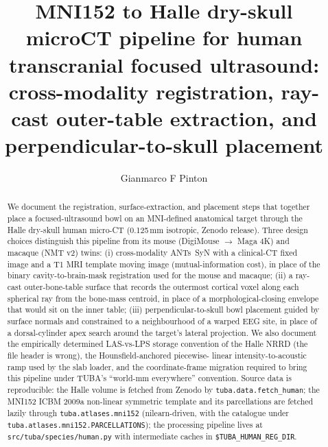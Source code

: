 \documentclass{compactarticle}
\begin{document}
\justifying
{}


\title{MNI152 to Halle dry-skull microCT pipeline for human transcranial
focused ultrasound: cross-modality registration, ray-cast outer-table
extraction, and perpendicular-to-skull placement}

\author{Gianmarco F Pinton}




\begin{abstract}
We document the registration, surface-extraction, and placement steps that
together place a focused-ultrasound bowl on an MNI-defined anatomical target
through the Halle dry-skull human micro-CT (0.125\,mm isotropic, Zenodo
release). Three design choices distinguish this pipeline from its mouse
(DigiMouse $\rightarrow$ Maga 4K) and macaque (NMT v2) twins:
(i) cross-modality ANTs~SyN with a clinical-CT fixed image and a T1 MRI
template moving image (mutual-information cost), in place of the binary
cavity-to-brain-mask registration used for the mouse and macaque; (ii) a
ray-cast outer-bone-table surface that records the outermost cortical voxel
along each spherical ray from the bone-mass centroid, in place of a
morphological-closing envelope that would sit on the inner table;
(iii) perpendicular-to-skull bowl placement guided by surface normals and
constrained to a neighbourhood of a warped EEG site, in place of a
dorsal-cylinder apex search around the target's lateral projection. We also
document the empirically determined LAS-vs-LPS storage convention of the
Halle NRRD (the file header is wrong), the Hounsfield-anchored piecewise-
linear intensity-to-acoustic ramp used by the slab loader, and the
coordinate-frame migration required to bring this pipeline under TUBA's
``world-mm everywhere'' convention. Source data is reproducible: the Halle
volume is fetched from Zenodo by \texttt{tuba.data.fetch\_human}; the
MNI152 ICBM 2009a non-linear symmetric template and its parcellations
are fetched lazily through \texttt{tuba.atlases.mni152} (nilearn-driven,
with the catalogue under \texttt{tuba.atlases.mni152.PARCELLATIONS});
the processing pipeline lives at \texttt{src/tuba/species/human.py} with
intermediate caches in \texttt{\$TUBA\_HUMAN\_REG\_DIR}.
\end{abstract}
\end{document}

